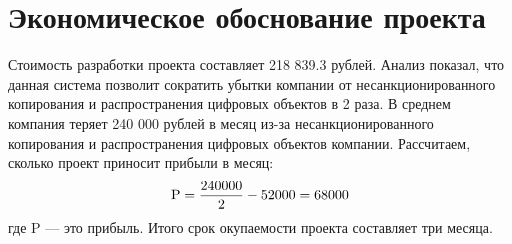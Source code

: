 \section{Экономическое обоснование проекта}
Стоимость разработки проекта составляет 218 839.3 рублей.
Анализ показал, что данная система позволит сократить убытки
компании от несанкционированного копирования и распространения цифровых объектов
в 2 раза. В среднем компания теряет 240 000 рублей в месяц из-за несанкционированного
копирования и распространения цифровых объектов компании. Рассчитаем, сколько проект приносит прибыли в месяц:
\begin{align*}
    \textup{P} = \dfrac{240000}{2} - 52000 = 68000
\end{align*}
где P --- это прибыль.
Итого срок окупаемости проекта составляет три месяца.